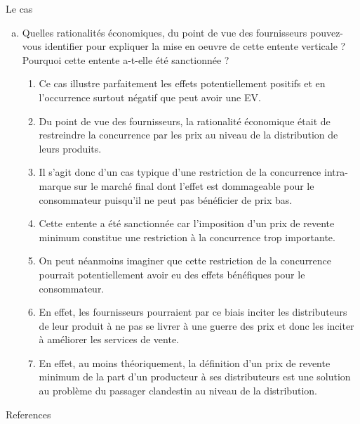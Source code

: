 \begin{frame}[allowframebreaks]{Le cas}
\begin{enumerate}[(a)]
\framebreak
\item Quelles rationalités économiques, du point de vue des fournisseurs 
pouvez-vous identifier pour expliquer la mise en oeuvre de cette 
entente verticale ? Pourquoi cette entente a-t-elle été sanctionnée ?
\begin{enumerate}[$\star$]
\item Ce cas illustre parfaitement les effets potentiellement positifs et
 en l’occurrence surtout négatif que peut avoir une EV. 
\item Du point de vue des fournisseurs, la rationalité économique était de restreindre 
la concurrence par
 les prix au niveau de la distribution de leurs produits. 
 \item Il s’agit donc d’un cas typique d’une restriction de la concurrence 
 intra-marque sur le marché final dont l’effet est dommageable pour le 
 consommateur puisqu’il ne peut pas bénéficier de prix bas. 
 \item Cette entente a été sanctionnée 
 car l’imposition d’un prix de revente minimum constitue une restriction à la concurrence
  trop importante.
  \item On peut néanmoins imaginer que cette restriction de la concurrence pourrait
   potentiellement avoir eu des effets bénéfiques pour le consommateur. 
   \item En effet, les fournisseurs pourraient par ce biais inciter les distributeurs de
    leur produit à ne pas se livrer à une guerre des prix et donc les inciter à améliorer
     les services de vente. 
     \item En effet, au moins théoriquement, 
     la définition d’un prix de revente minimum de la part d’un producteur 
     à ses distributeurs est une solution au problème du passager clandestin 
     au niveau de la distribution.
\end{enumerate}
\end{enumerate}
\end{frame}

\begin{frame}[allowframebreaks]{References}


\end{frame}


